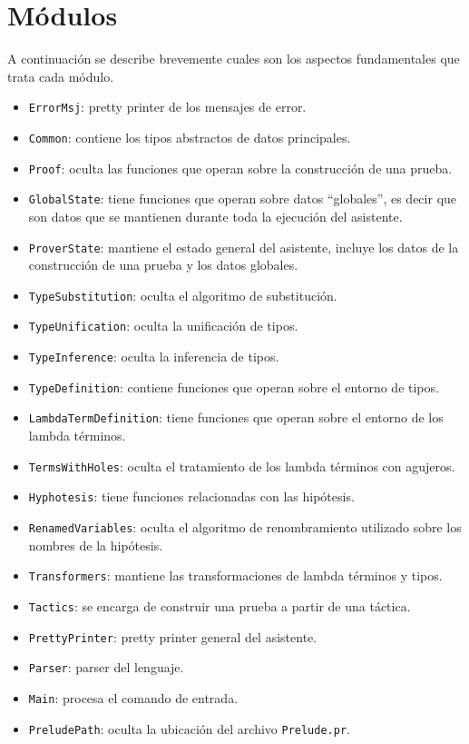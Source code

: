 \documentclass[a4paper,11pt]{article}
\theoremstyle{definition}
\begin{document}
\section{Módulos}

A continuación se describe brevemente cuales son los aspectos fundamentales que trata cada módulo.

\begin{itemize}

\item \texttt{ErrorMsj}: pretty printer de los mensajes de error.
\item \texttt{Common}: contiene los tipos abstractos de datos principales.
\item \texttt{Proof}: oculta las funciones que operan sobre la construcción de una prueba.
\item \texttt{GlobalState}: tiene funciones que operan sobre datos ``globales'', es decir que son
datos que se mantienen durante toda la ejecución del asistente.
\item \texttt{ProverState}: mantiene el estado general del asistente, incluye los datos de la
construcción de una prueba y los datos globales.
\item \texttt{TypeSubstitution}: oculta el algoritmo de substitución.
\item \texttt{TypeUnification}: oculta la unificación de tipos.
\item \texttt{TypeInference}: oculta la inferencia de tipos.
\item \texttt{TypeDefinition}: contiene funciones que operan sobre el entorno de tipos.
\item \texttt{LambdaTermDefinition}: tiene funciones que operan sobre el entorno de los lambda términos.
\item \texttt{TermsWithHoles}: oculta el tratamiento de los lambda términos con agujeros.
\item \texttt{Hyphotesis}: tiene funciones relacionadas con las hipótesis.
\item \texttt{RenamedVariables}: oculta el algoritmo de renombramiento utilizado sobre los nombres de la hipótesis.
\item \texttt{Transformers}: mantiene las transformaciones de lambda términos y tipos.
\item \texttt{Tactics}: se encarga de construir una prueba a partir de una táctica.
\item \texttt{PrettyPrinter}: pretty printer general del asistente.
\item \texttt{Parser}: parser del lenguaje.
\item \texttt{Main}: procesa el comando de entrada. 
\item \texttt{PreludePath}: oculta la ubicación del archivo \texttt{Prelude.pr}.

\end{itemize}
\end{document}
